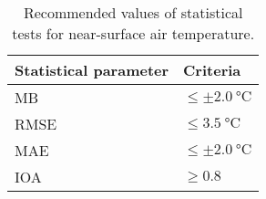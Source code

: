 	\begin{table}	
		\caption{Recommended values of statistical tests for near-surface air temperature.}
		\label{tab:performance-statistics-threshold}
		\centering
		\begin{tabular}{l l}
			\hline \hline
			Statistical parameter & Criteria\\
			\hline
			MB & $\leq \pm \qty{2.0}{\degreeCelsius}$ \\
			RMSE & $\leq \qty{3.5}{\degreeCelsius}$\\
			MAE & $\leq \pm \qty{2.0}{\degreeCelsius}$\\
			IOA	& $\geq \num{0.8}$\\
			\hline
		\end{tabular}		
	\end{table}
	
	